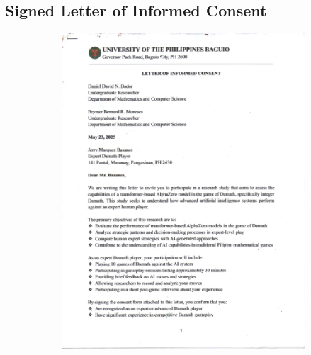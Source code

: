 \begin{appendices}

\chapter{Signed Letter of Informed Consent}

\begin{figure}[H]
    \centering
    \begin{subfigure}{0.3\textwidth}
        \centering
        \includegraphics[page=1,width=\linewidth]{images/Letter of Informed Consent.pdf}
    \end{subfigure}
    \begin{subfigure}{0.3\textwidth}
        \centering

\end{subfigure}
\end{figure}
\end{appendices}

